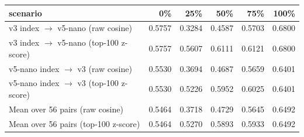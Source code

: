 \begin{tabular}{lrrrrr}
\toprule
scenario & 0\% & 25\% & 50\% & 75\% & 100\% \\
\midrule
v3 index $\to$ v5-nano (raw cosine) & 0.5757 & 0.3284 & 0.4587 & 0.5703 & 0.6800 \\
v3 index $\to$ v5-nano (top-100 z-score) & 0.5757 & 0.5607 & 0.6111 & 0.6121 & 0.6800 \\
v5-nano index $\to$ v3 (raw cosine) & 0.5530 & 0.3694 & 0.4687 & 0.5659 & 0.6401 \\
v5-nano index $\to$ v3 (top-100 z-score) & 0.5530 & 0.5226 & 0.5952 & 0.6025 & 0.6401 \\
\midrule
Mean over 56 pairs (raw cosine) & 0.5464 & 0.3718 & 0.4729 & 0.5645 & 0.6492 \\
Mean over 56 pairs (top-100 z-score) & 0.5464 & 0.5270 & 0.5893 & 0.5933 & 0.6492 \\
\bottomrule
\end{tabular}
